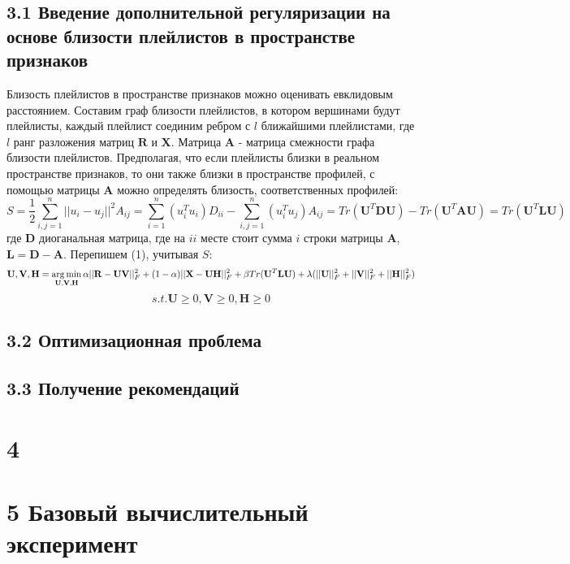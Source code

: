 \documentclass[12pt,twoside]{article}
\begin{document}
\subsection{3.1 Введение дополнительной регуляризации на основе близости плейлистов в пространстве признаков}

{Близость плейлистов в пространстве признаков можно оценивать евклидовым расстоянием. Составим граф близости плейлистов, в котором вершинами будут плейлисты, каждый плейлист соединим ребром с $l$ ближайшими плейлистами, где $l$ ранг разложения матриц $\mathbf{R}$ и $\mathbf{X}$. Матрица $\mathbf{A}$ - матрица смежности графа близости плейлистов. Предполагая, что если плейлисты близки в реальном пространстве признаков, то они также близки в пространстве профилей, с помощью матрицы $\mathbf{A}$ можно определять близость, соответственных профилей:
$$S = \frac{1}{2}\sum_{i, j = 1}^n||u_i - u_j||^2A_{ij} = \sum_{i = 1}^n (u_i^Tu_i)D_{ii} - \sum_{i,j = 1}^n (u_i^Tu_j)A_{ij} = {Tr}(\mathbf{U}^T\mathbf{DU}) -  {Tr}(\mathbf{U}^T\mathbf{AU}) = {Tr}(\mathbf{U}^T\mathbf{LU})$$
где $\mathbf{D}$ диоганальная матрица, где на $ii$ месте стоит сумма $i$ строки матрицы $\mathbf{A}$, $\mathbf{L} = \mathbf{D} - \mathbf{A}$. Перепишем (1), учитывая $S$:
$$\mathbf{U, V, H} = \argmin_{\mathbf{U, V, H}}\alpha||\mathbf{R} - \mathbf{UV}||_F^2 +(1 - \alpha) ||\mathbf{X} - \mathbf{UH}||_F^2 +  \beta{Tr}(\mathbf{U}^T\mathbf{LU}) +  \lambda(||\mathbf{U}||_F^2 + ||\mathbf{V}||_F^2 + ||\mathbf{H}||_F^2)$$
$$ s.t. \mathbf{U} \geq 0,  \mathbf{V} \geq 0,  \mathbf{H} \geq 0$$}

\subsection{3.2 Оптимизационная проблема}

\subsection{3.3 Получение рекомендаций}

\section{4}

\section{5 Базовый вычислительный эксперимент}
\end{document}
